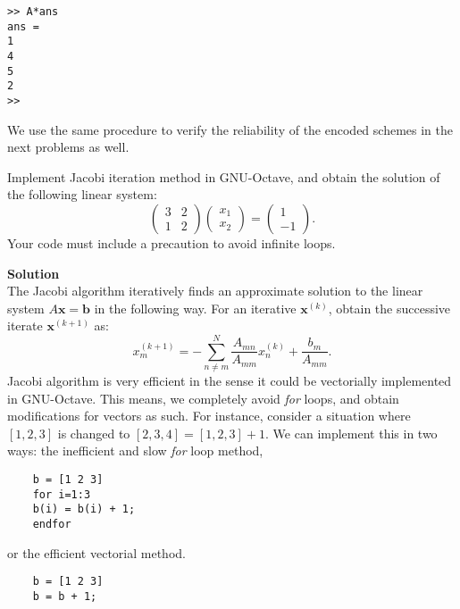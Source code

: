 \documentclass[11pt,a4paper,reqno]{article}
\begin{document}
 \begin{mdframed}[style=cframe,nobreak=true,align=center]
	\begin{verbatim}
>> A*ans
ans =
1
4
5
2
>>
\end{verbatim}
\end{mdframed}
We use the same procedure to verify the reliability of the encoded schemes in the next problems as well.
\begin{problem}	 \label{pr:pr_2}
Implement Jacobi iteration method in GNU-Octave, and obtain the solution of the following linear system:
\begin{equation}
\begin{pmatrix}
3 & 2\\1 & 2
\end{pmatrix}\begin{pmatrix}
x_1 \\ x_2
\end{pmatrix} = \begin{pmatrix}
1 \\-1
\end{pmatrix}.
\end{equation}
Your code must include a precaution to avoid infinite loops.
\end{problem}
\textbf{Solution} \vspace{0.2cm} \\ 
The Jacobi algorithm iteratively finds an approximate solution to the linear system $A{\pmb x} = {\pmb b}$ in the following way. For an iterative ${\pmb x}^{(k)}$, obtain the successive iterate ${\pmb x}^{(k+1)}$ as:
\begin{equation}
x_{m}^{(k+1)} = -\sum_{n\not=m}^N \dfrac{A_{mn}}{A_{mm}}x_{n}^{(k)} + \dfrac{b_{m}}{A_{mm}}.
\end{equation}
Jacobi algorithm is very efficient in the sense it could be vectorially implemented in GNU-Octave. This means, we completely avoid \emph{for} loops, and obtain modifications for vectors as such. For instance, consider a situation where $[1,2,3]$ is changed to $[2,3,4] = [1,2, 
3] + 1$. We can implement this in two ways: the inefficient and slow \emph{for} loop method,
\begin{mdframed}[style=cframe,nobreak=true,align=center]
	\begin{verbatim}
	b = [1 2 3]
	for i=1:3
	b(i) = b(i) + 1;
	endfor
	\end{verbatim}
\end{mdframed}
or the efficient vectorial method.
\begin{mdframed}[style=cframe,nobreak=true,align=center]
	\begin{verbatim}
	b = [1 2 3]
	b = b + 1;
	\end{verbatim}
\end{mdframed}
\end{document}
